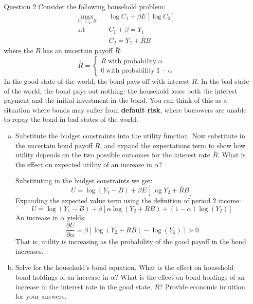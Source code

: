 \documentclass[a4paper]{article}
\begin{document}
	\begin{questionbox}{Question 2}
		Consider the following household problem:
		\begin{align*}
			\max_{C_1,C_2,B} \quad &\log C_1 + \beta E[\log C_2]\\
			\text{s.t} \quad &C_1 + \beta = Y_1\\
			&C_2 = Y_2 + \bar{R}B
		\end{align*}
		where the \( B \) has an uncertain payoff \( \bar{R} \):
		\[
			\bar{R}=
			\begin{cases}
				R \;\text{with probability}\; \alpha\\
				0 \;\text{with probability}\; 1 - \alpha
			\end{cases}
		\]
		In the good state of the world, the bond pays oﬀ with interest \( R \). In the bad state of the world, the bond pays out nothing: the household loses both the interest payment and the initial investment in the bond. You can think of this as a situation where bonds may suﬀer from \textbf{default risk}, where borrowers are unable to repay the bond in bad states of the world.
			\begin{enumerate}[(a)]
				\item Substitute the budget constraints into the utility function. Now substitute in the uncertain bond payoff \( \bar{R} \), and expand the expectations term to show how utility depends on the two possible outcomes for the interest rate \( \bar{R} \). What is the eﬀect on expected utility of an increase in \( \alpha \)?
				\begin{explanationbox}
					Substituting in the budget constraints we get:
					\[
						U = \log (Y_1 - B) + \beta E\left[ \log Y_2 + \bar{R} B \right]
					\]
					Expanding the expected value term using the deﬁnition of period 2 income:
					\[
						U = \log (Y_1 - B) + \beta \left[ \alpha \log (Y_2 + RB) + (1-\alpha)\log (Y_2) \right]
					\]
					An increase in \( \alpha \) yields:
					\[
						\frac{\partial U}{\partial \alpha} = \beta [\log (Y_2 + RB) - \log(Y_2)] > 0
					\]
					That is, utility is increasing as the probability of the good payoﬀ in the bond increases.
				\end{explanationbox}
				\item Solve for the household’s bond equation. What is the eﬀect on household bond holdings of an increase in \( \alpha \)? What is the eﬀect on bond holdings of an increase in the interest rate in the good state, \( R \)? Provide economic intuition for your answers.
				\begin{explanationbox}

\end{explanationbox}
\end{enumerate}
\end{questionbox}
\end{document}
